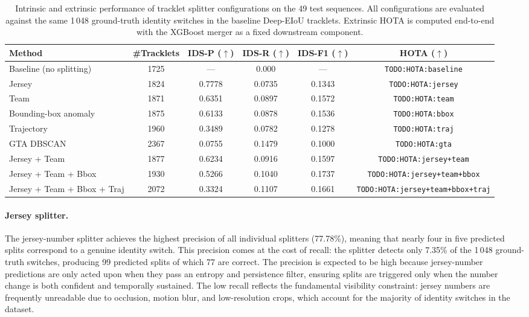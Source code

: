 \begin{table}[H]
\centering
\begin{tabular}{lccccc}
\toprule
\textbf{Method} & \textbf{\#Tracklets} & \textbf{IDS-P} ($\uparrow$) & \textbf{IDS-R} ($\uparrow$) & \textbf{IDS-F1} ($\uparrow$) & \textbf{HOTA} ($\uparrow$) \\
\midrule
Baseline (no splitting)     & 1725 & ---    & 0.000  & ---    & \texttt{TODO:HOTA:baseline} \\
\midrule
Jersey                      & 1824 & 0.7778 & 0.0735 & 0.1343 & \texttt{TODO:HOTA:jersey} \\
Team                        & 1871 & 0.6351 & 0.0897 & 0.1572 & \texttt{TODO:HOTA:team} \\
Bounding-box anomaly        & 1875 & 0.6133 & 0.0878 & 0.1536 & \texttt{TODO:HOTA:bbox} \\
Trajectory                  & 1960 & 0.3489 & 0.0782 & 0.1278 & \texttt{TODO:HOTA:traj} \\
GTA DBSCAN                  & 2367 & 0.0755 & 0.1479 & 0.1000 & \texttt{TODO:HOTA:gta} \\
\midrule
Jersey + Team               & 1877 & 0.6234 & 0.0916 & 0.1597 & \texttt{TODO:HOTA:jersey+team} \\
Jersey + Team + Bbox        & 1930 & 0.5266 & 0.1040 & 0.1737 & \texttt{TODO:HOTA:jersey+team+bbox} \\
Jersey + Team + Bbox + Traj & 2072 & 0.3324 & 0.1107 & 0.1661 & \texttt{TODO:HOTA:jersey+team+bbox+traj} \\
\bottomrule
\end{tabular}
\caption{Intrinsic and extrinsic performance of tracklet splitter configurations
on the 49 test sequences. All configurations are evaluated against the same
1\,048 ground-truth identity switches in the baseline Deep-EIoU tracklets.
Extrinsic HOTA is computed end-to-end with the XGBoost merger as a fixed
downstream component.}
\label{tab:splitter_comparison}
\end{table}

\paragraph{Jersey splitter.}
The jersey-number splitter achieves the highest precision of all individual
splitters (77.78\%), meaning that nearly four in five predicted splits
correspond to a genuine identity switch. This precision comes at the cost of
recall: the splitter detects only 7.35\% of the 1\,048 ground-truth switches,
producing 99 predicted splits of which 77 are correct. The precision is
expected to be high because jersey-number predictions are only acted upon when
they pass an entropy and persistence filter, ensuring splits are triggered only
when the number change is both confident and temporally sustained. The low
recall reflects the fundamental visibility constraint: jersey numbers are
frequently unreadable due to occlusion, motion blur, and low-resolution crops,
which account for the majority of identity switches in the dataset.

